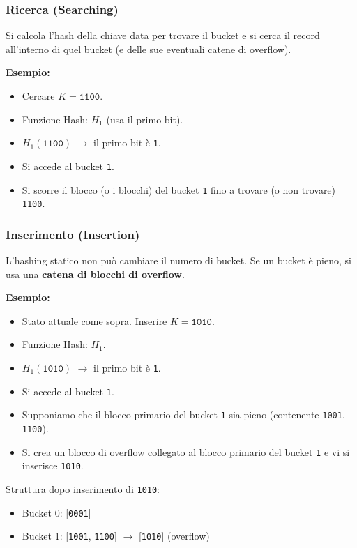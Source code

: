 \subsubsection{Ricerca (Searching)}
Si calcola l'hash della chiave data per trovare il bucket e si cerca il record all'interno di quel bucket (e delle sue eventuali catene di overflow).

\textbf{Esempio:}
\begin{itemize}
    \item Cercare $K = \texttt{1100}$.
    \item Funzione Hash: $H_1$ (usa il primo bit).
    \item $H_1(\texttt{1100})$ $\rightarrow$ il primo bit è \texttt{1}.
    \item Si accede al bucket \texttt{1}.
    \item Si scorre il blocco (o i blocchi) del bucket \texttt{1} fino a trovare (o non trovare) \texttt{1100}.
\end{itemize}

\subsubsection{Inserimento (Insertion)}
L'hashing statico non può cambiare il numero di bucket. Se un bucket è pieno, si usa una \textbf{catena di blocchi di overflow}.

\textbf{Esempio:}
\begin{itemize}
    \item Stato attuale come sopra. Inserire $K = \texttt{1010}$.
    \item Funzione Hash: $H_1$.
    \item $H_1(\texttt{1010})$ $\rightarrow$ il primo bit è \texttt{1}.
    \item Si accede al bucket \texttt{1}.
    \item Supponiamo che il blocco primario del bucket \texttt{1} sia pieno (contenente \texttt{1001}, \texttt{1100}).
    \item Si crea un blocco di overflow collegato al blocco primario del bucket \texttt{1} e vi si inserisce \texttt{1010}.
\end{itemize}
Struttura dopo inserimento di \texttt{1010}:
\begin{itemize}
    \item Bucket 0: [\texttt{0001}]
    \item Bucket 1: [\texttt{1001}, \texttt{1100}] $\rightarrow$ [\texttt{1010}] (overflow)
\end{itemize}

